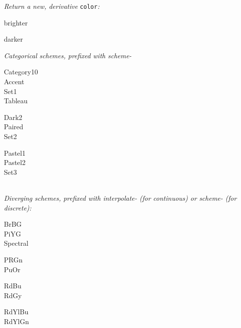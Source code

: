 \textit{Return a new, derivative }\texttt{color}\textit{:}


{\footnotesize
\begin{minipage}[t]{3.0cm}
    brighter
\end{minipage}
\begin{minipage}[t]{3.0cm}
    darker
\end{minipage}
}



\textit{Categorical schemes, prefixed with scheme-}

{\footnotesize
\begin{minipage}[t]{2.0cm}
    Category10\\
    Accent\\
    Set1\\
    Tableau
\end{minipage}
\begin{minipage}[t]{2.0cm}
    Dark2\\
    Paired\\
    Set2
\end{minipage}
\begin{minipage}[t]{2.0cm}
    Pastel1\\
    Pastel2\\
    Set3
\end{minipage}
}
\\[1mm]

\textit{Diverging schemes, prefixed with interpolate- (for continuous) or scheme- (for discrete):}

{\footnotesize
\begin{minipage}[t]{1.5cm}
    BrBG\\
    PiYG\\
    Spectral
\end{minipage}
\begin{minipage}[t]{1.5cm}
    PRGn\\
    PuOr
\end{minipage}
\begin{minipage}[t]{1.5cm}
    RdBu\\
    RdGy
\end{minipage}
\begin{minipage}[t]{1.5cm}
    RdYlBu\\
    RdYlGn
\end{minipage}
}
\\[1mm]

